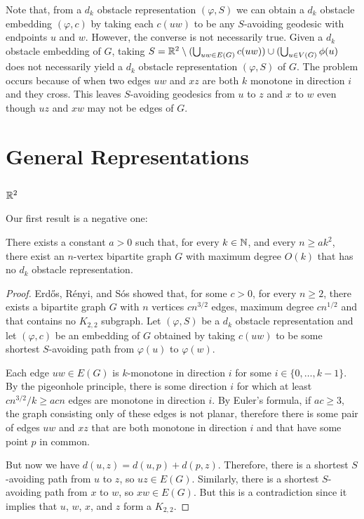 \documentclass{patmorin}
\begin{document}
Note that, from a $d_k$ obstacle representation $(\varphi, S)$ we
can obtain a $d_k$ obstacle embedding $(\varphi, c)$ by taking each
$c(uw)$ to be any $S$-avoiding geodesic with endpoints $u$ and $w$.
However, the converse is not necessarily true.  Given a $d_k$ obstacle
embedding of $G$, taking $S=\mathbb{R}^2\setminus (\bigcup_{uw\in E(G)}c(uw))\cup
(\bigcup_{u\in V(G)} \phi(u)$ does not necessarily yield a $d_k$ obstacle
representation $(\varphi,S)$ of $G$.  The problem occurs because of
 when two edges $uw$ and $xz$ are both $k$ monotone in
direction $i$ and they cross. This leaves $S$-avoiding geodesics from $u$
to $z$ and $x$ to $w$ even though $uz$ and $xw$ may not be edges of $G$.



\section{General Representations}

\subsection{$\mathbb{R}^2$}

Our first result is a negative one:

\begin{thm}
  There exists a constant $a>0$ such that, for every $k\in \mathbb{N}$, and every
  $n\ge ak^2$, there exist an $n$-vertex bipartite graph $G$ with maximum
  degree $O(k)$ that has no $d_k$ obstacle representation.
\end{thm}

\begin{proof}
   Erd\H{o}s, R\'enyi, and S\'os \cite{erdos.renyi.ea:1966} showed that,
   for some $c>0$, for every $n\ge 2$, there exists a bipartite graph
   $G$ with $n$ vertices $cn^{3/2}$ edges, maximum degree $cn^{1/2}$
   and that contains no $K_{2,2}$ subgraph.  Let $(\varphi,S)$ be a
   $d_k$ obstacle representation and let $(\varphi,c)$
   be an embedding of $G$ obtained by taking $c(uw)$ to be some shortest
   $S$-avoiding path from $\varphi(u)$ to $\varphi(w)$.

   Each edge $uw\in E(G)$ is $k$-monotone in direction $i$ for some
   $i\in\{0,\ldots,k-1\}$.  By the pigeonhole principle, there is
   some direction $i$ for which at least $cn^{3/2}/k\ge acn$ edges
   are monotone in direction $i$.  By Euler's formula, if $ac\ge 3$,
   the graph consisting only of these edges is not planar, therefore
   there is some pair of edges $uw$ and $xz$ that are both monotone in
   direction $i$ and that have some point $p$ in common.

   But now we have $d(u,z)=d(u,p)+d(p,z)$.  Therefore, there is a shortest
   $S$-avoiding path from $u$ to $z$, so $uz\in E(G)$.  Similarly, there
   is a shortest $S$-avoiding path from $x$ to $w$, so $xw\in E(G)$.
   But this is a contradiction since it implies that $u$, $w$, $x$,
   and $z$ form a $K_{2,2}$.
\end{proof}
\end{document}
